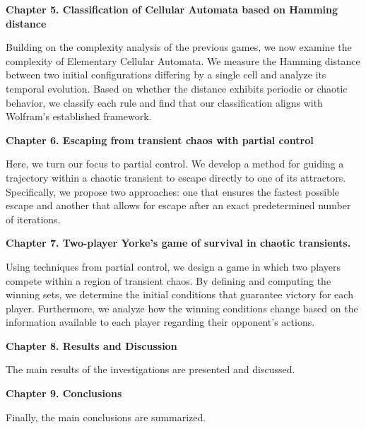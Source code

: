 {\bf  Chapter 5. Classification of Cellular Automata based on Hamming distance}

\vspace{0.6cm}

Building on the complexity analysis of the previous games, we now examine the complexity of Elementary Cellular Automata. We measure the Hamming distance between two initial configurations differing by a single cell and analyze its temporal evolution. Based on whether the distance exhibits periodic or chaotic behavior, we classify each rule and find that our classification aligns with Wolfram's established framework.

\vspace{0.6cm}

{\bf  Chapter 6. Escaping from transient chaos with partial control} 

\vspace{0.6cm}

Here, we turn our focus to partial control. We develop a method for guiding a trajectory within a chaotic transient to escape directly to one of its attractors. Specifically, we propose two approaches: one that ensures the fastest possible escape and another that allows for escape after an exact predetermined number of iterations.

\vspace{0.6cm}


{\bf  Chapter 7. Two-player Yorke's game of survival in chaotic transients.}

\vspace{0.6cm}

Using techniques from partial control, we design a game in which two players compete within a region of transient chaos. By defining and computing the winning sets, we determine the initial conditions that guarantee victory for each player. Furthermore, we analyze how the winning conditions change based on the information available to each player regarding their opponent's actions.


\vspace{0.6cm}

{\bf  Chapter 8. Results and Discussion}

\vspace{0.6cm}

The main results of the investigations are presented and discussed.


\vspace{0.6cm}

{\bf  Chapter 9. Conclusions}

\vspace{0.6cm}

Finally, the main conclusions are summarized.